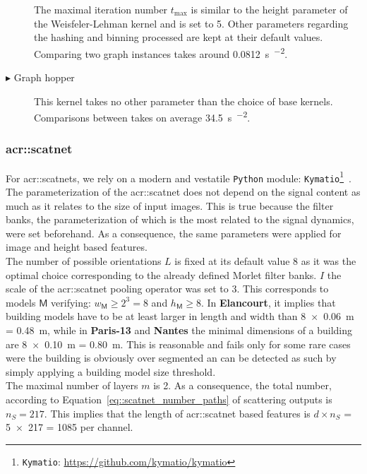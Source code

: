 \begin{description}
                    The maximal iteration number \(t_{\max}\) is similar to the height parameter of the Weisfeler-Lehman kernel and is set to 5.
                    Other parameters regarding the hashing and binning processed are kept at their default values.
                    Comparing two graph instances takes around \SI[scientific-notation = true]{0.0812}{\s\per\building\squared}.
                \item[\(\blacktriangleright\) Graph hopper] This kernel takes no other parameter than the choice of base kernels.
                    Comparisons between takes on average \SI{34.5}{\s\per\building\squared}.
            \end{description}
        
        \subsubsection{\gls*{acr::scatnet}}
            For \glspl{acr::scatnet}, we rely on a modern and vestatile \verb!Python! module: \verb!Kymatio!\footnote{\verb!Kymatio!: \href{https://github.com/kymatio/kymatio}{https://github.com/kymatio/kymatio}}~\parencite{andreux2018kymatio}.
            The parameterization of the \gls{acr::scatnet} does not depend on the signal content as much as it relates to the size of input images.
            This is true because the filter banks, the parameterization of which is the most related to the signal dynamics, were set beforehand.
            As a consequence, the same parameters were applied for image and height based features.\\
        
            The number of possible orientations \(L\) is fixed at its default value 8 as it was the optimal choice corresponding to the already defined Morlet filter banks.
            \(I\) the scale of the \gls{acr::scatnet} pooling operator was set to 3.
            This corresponds to models \(\mathsf{M}\) verifying: \(w_{\mathsf{M}} \geq 2^3 = 8\) and \(h_{\mathsf{M}} \geq 8\).
            In \textbf{Elancourt}, it implies that building models have to be at least larger in length and width than \SI{8 x 0.06}{\m} = \SI{0.48}{\m}, while in \textbf{Paris-13} and \textbf{Nantes} the minimal dimensions of a building are \SI{8 x 0.10}{\m} = \SI{0.80}{\m}.
            This is reasonable and fails only for some rare cases were the building is obviously over segmented an can be detected as such by simply applying a building model size threshold.\\
            The maximal number of layers \(m\) is 2.
            As a consequence, the total number, according to Equation~\ref{eq::scatnet_number_paths} of scattering outputs is \(n_S = 217\).
            This implies that the length of \gls{acr::scatnet} based features is \(d \times n_S\) = \num{5 x 217} = 1085 per channel.\\
        

